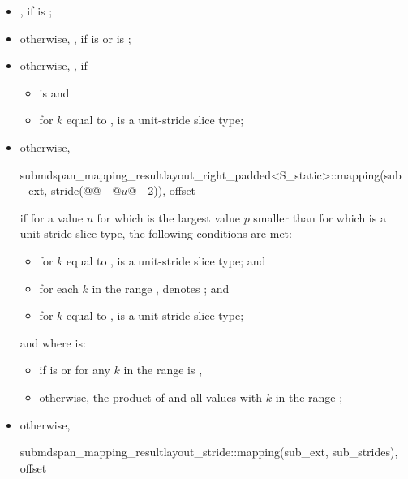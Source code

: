 \begin{itemdescr}
\pnum
\returns
\begin{itemize}
\item
{},
if  is ;
\item
otherwise,
,\newline
if  is  or
 is ;
\item
otherwise,
,
if
\begin{itemize}
\item
{} is  and
\item
for $k$ equal to ,
 is a unit-stride slice type;
\end{itemize}
\item
otherwise,
\begin{codeblock}
submdspan_mapping_result{layout_right_padded<S_static>::mapping(sub_ext,
                             stride(@@ - @$u$@ - 2)), offset}
\end{codeblock}
if for a value $u$
for which 
is the largest value $p$ smaller than 
for which  is a unit-stride slice type,
the following conditions are met:
\begin{itemize}
\item
for $k$ equal to ,
 is a unit-stride slice type; and
\item
for each $k$ in the range
,\newline
{} denotes ; and
\item
for $k$ equal to ,
 is a unit-stride slice type;
\end{itemize}
and where  is:
\begin{itemize}
\item
{}
if  is  or
for any $k$ in the range 
 is ,
\item
otherwise, the product of  and
all values 
with $k$ in the range ;
\end{itemize}
\item
otherwise,
\begin{codeblock}
submdspan_mapping_result{layout_stride::mapping(sub_ext, sub_strides), offset}
\end{codeblock}
\end{itemize}
\end{itemdescr}

